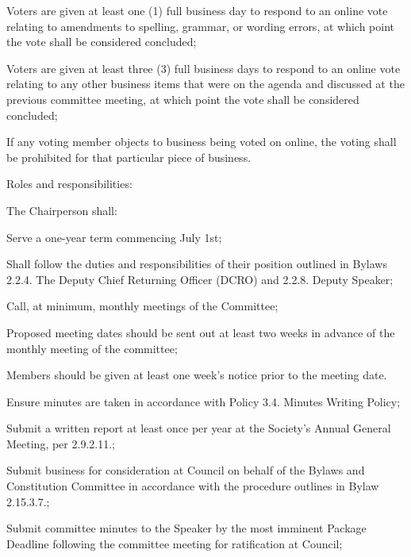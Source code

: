 \begin{longenum}[ label*=\thesubsection.\arabic*., align=left]
\begin{longenum}[ label*=\arabic*., align=left]
		\begin{longenum}[ label*=\arabic*., align=left] 	
		\item Voters are given at least one (1) full business day to respond to an online vote relating to amendments to spelling, grammar, or wording errors, at which point the vote shall be considered concluded;
		\item Voters are given at least three (3) full business days to respond to an online vote relating to any other business items that were on the agenda and discussed at the previous committee meeting, at which point the vote shall be considered concluded;
		\item If any voting member objects to business being voted on online, the voting shall be prohibited for that particular piece of business.	
		\end{longenum}	
\item Roles and responsibilities:
	\begin{longenum}[ label*=\arabic*., align=left] 
	\item The Chairperson shall:
		\begin{longenum}[ label*=\arabic*., align=left] 
		\item Serve a one-year term commencing July 1st;
		\item Shall follow the duties and responsibilities of their position outlined in Bylaws 2.2.4. The Deputy Chief Returning Officer (DCRO) and 2.2.8. Deputy Speaker;
		\item Call, at minimum, monthly meetings of the Committee;
			\begin{longenum}[ label*=\arabic*., align=left] 
			\item Proposed meeting dates should be sent out at least two weeks in advance of the monthly meeting of the committee;
			\item Members should be given at least one week's notice prior to the meeting date.
			\end{longenum}
		\item Ensure minutes are taken in accordance with Policy 3.4. Minutes Writing Policy;
		\item Submit a written report at least once per year at the Society's Annual General Meeting, per 2.9.2.11.;
		\item Submit business for consideration at Council on behalf of the Bylaws and Constitution Committee in accordance with the procedure outlines in Bylaw 2.15.3.7.;
		\item Submit committee minutes to the Speaker by the most imminent Package Deadline following the committee meeting for ratification at Council; 

\end{longenum}
\end{longenum}
\end{longenum}
\end{longenum}
